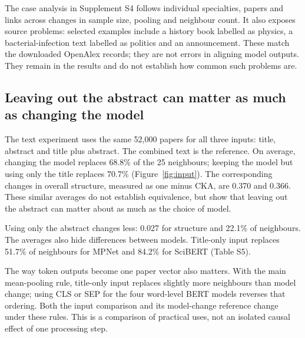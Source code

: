 \documentclass[12pt]{article}
\begin{document}
The case analysis in Supplement S4 follows individual specialties, papers and links across changes in sample size, pooling and neighbour count. It also exposes source problems: selected examples include a history book labelled as physics, a bacterial-infection text labelled as politics and an announcement. These match the downloaded OpenAlex records; they are not errors in aligning model outputs. They remain in the results and do not establish how common such problems are.

\FloatBarrier
\subsection{Leaving out the abstract can matter as much as changing the model}
The text experiment uses the same 52,000 papers for all three inputs: title, abstract and title plus abstract. The combined text is the reference. On average, changing the model replaces 68.8\% of the 25 neighbours; keeping the model but using only the title replaces 70.7\% (Figure~\ref{fig:input}). The corresponding changes in overall structure, measured as one minus CKA, are 0.370 and 0.366. These similar averages do not establish equivalence, but show that leaving out the abstract can matter about as much as the choice of model.

Using only the abstract changes less: 0.027 for structure and 22.1\% of neighbours. The averages also hide differences between models. Title-only input replaces 51.7\% of neighbours for MPNet and 84.2\% for SciBERT (Table S5).

The way token outputs become one paper vector also matters. With the main mean-pooling rule, title-only input replaces slightly more neighbours than model change; using CLS or SEP for the four word-level BERT models reverses that ordering. Both the input comparison and its model-change reference change under these rules. This is a comparison of practical uses, not an isolated causal effect of one processing step.
\end{document}
